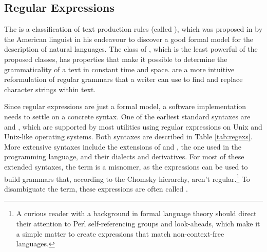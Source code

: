 \documentclass{book}
\begin{document}
\subsection{Regular Expressions}\label{sec:regexs}
The  is a classification of text production rules
(called ), which was proposed \cite{chomsky56} in
\citeyear{chomsky56} by the American linguist  in his
endeavour to discover a good formal model for the description of natural
languages. The class of , which is the least powerful
of the proposed classes, has properties that make it possible to determine the
grammaticality of a text in constant time and space.  are a more intuitive reformulation of regular grammars that a writer
can use to find and replace character strings within text.

Since regular expressions are just a formal model, a software implementation
needs to settle on a concrete syntax. One of the earliest standard syntaxes are
 and , which are supported by most utilities using
regular expressions on Unix and Unix-like operating systems. Both syntaxes are
described in Table \ref{tab:regexs}. More extensive syntaxes include the
 extensions of  and , the one used
in the  programming language, and their dialects and derivatives. For
most of these extended syntaxes, the term  is a misnomer, as the
expressions can be used to build grammars that, according to the Chomsky
hierarchy, aren't regular.\footnote{
  A curious reader with a background in formal language theory should direct
  their attention to Perl self-referencing groups and look-aheads, which make it
  a simple matter to create expressions that match non-context-free languages.
} To disambiguate the term, these expressions are often called
.

\end{document}
